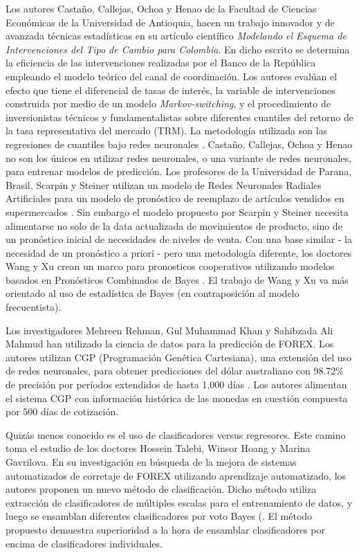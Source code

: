 Los autores Castaño, Callejas, Ochoa y Henao de la Facultad de Ciencias Económicas de la Universidad de Antioquia, hacen un trabajo innovador y de avanzada técnicas estadísticas en su artículo científico \emph{Modelando el Esquema de Intervenciones del Tipo de Cambio para Colombia}. En dicho escrito se determina la eficiencia de las intervenciones realizadas por el Banco de la República empleando el modelo teórico del canal de coordinación. Los autores evalúan el efecto que tiene el diferencial de tasas de interés, la variable de intervenciones construida por medio de un modelo \emph{Markov-switching}, y el procedimiento de inversionistas técnicos y fundamentalistas sobre diferentes cuantiles del retorno de la tasa representativa del mercado (TRM). La metodología utilizada son las regresiones de cuantiles bajo redes neuronales \cite{modelandoIntervenciones}. Castaño, Callejas, Ochoa y Henao no son los únicos en utilizar redes neuronales, o una variante de redes neuronales, para entrenar modelos de predicción. Los profesores de la Universidad de Parana, Brasil, Scarpin y Steiner utilizan un modelo de Redes Neuronales Radiales Artificiales para un modelo de pronóstico de reemplazo de artículos vendidos en supermercados \cite{scarpinSteiner}. Sin embargo el modelo propuesto por Scarpin y Steiner necesita alimentarse no solo de la data actualizada de movimientos de producto, sino de un pronóstico inicial de necesidades de niveles de venta. Con una base similar - la necesidad de un pronóstico a priori - pero una metodología diferente, los doctores Wang y Xu crean un marco para pronosticos cooperativos utilizando modelos basados en Pronósticos Combinados de Bayes \cite{wangXu}. El trabajo de Wang y Xu va más orientado al uso de estadística de Bayes (en contraposición al modelo frecuentista).

Los investigadores Mehreen Rehman, Gul Muhammad Khan y Sahibzada Ali Mahmud han utilizado la ciencia de datos para la predicción de FOREX. Los autores utilizan CGP (Programación Genética Cartesiana), una extensión del uso de redes neuronales, para obtener predicciones del dólar australiano con 98.72\% de precisión por períodos extendidos de hasta 1,000 días \cite{rehmanKhanMahmud}. Los autores alimentan el sistema CGP con información histórica de las monedas en cuestión compuesta por 500 días de cotización.

Quizás menos conocido es el uso de clasificadores versus regresores. Este camino toma el estudio de los doctores Hossein Talebi, Winsor Hoang y Marina Gavrilova. En su investigación en búsqueda de la mejora de sistemas automatizados de corretaje de FOREX utilizando aprendizaje automatizado, los autores proponen un nuevo método de clasificación. Dicho método utiliza extracción de clasificadores de múltiples escalas para el entrenamiento de datos, y luego se ensamblan diferentes clasificadores por voto Bayes (\cite{talebiHoang}. El método propuesto demuestra superioridad a la hora de ensamblar clasificadores por encima de clasificadores individuales.

